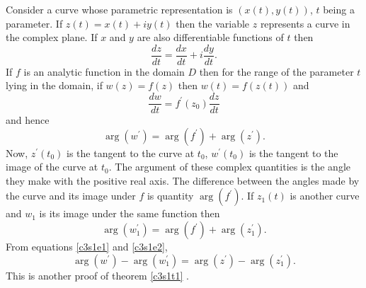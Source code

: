Consider a curve whose parametric representation is $(x(t), y(t))$, $t$ 
being a parameter. If $z(t) = x(t) + iy(t)$ then the variable $z$ represents
a curve in the complex plane. If $x$ and $y$ are also differentiable functions
of $t$ then
\[
\frac{dz}{dt} = \frac{dx}{dt} + i\frac{dy}{dt}.
\]
If $f$ is an analytic function in the domain $D$ then for the range of the
parameter $t$ lying in the domain, if $w(z) = f(z)$ then $w(t) = f(z(t))$ and
\[
\frac{dw}{dt} = f^\prime(z_0)\frac{dz}{dt}
\]
and hence
\begin{equation}\label{c3s1e1}
\arg(w^\prime) = \arg(f^\prime) + \arg(z^\prime).
\end{equation}
Now, $z^\prime(t_0)$ is the tangent to the curve at $t_0$, $w^\prime(t_0)$ is
the tangent to the image of the curve at $t_0$. The argument of these complex
quantities is the angle they make with the positive real axis. The difference 
between the angles made by the curve and its image under $f$ is quantity
$\arg(f^\prime)$. If $z_1(t)$ is another curve and $w_1$ is its image under
the same function then
\begin{equation}\label{c3s1e2}
\arg(w_1^\prime) = \arg(f^\prime) + \arg(z_1^\prime).
\end{equation}
From equations \eqref{c3s1e1} and \eqref{c3s1e2},
\begin{equation}\label{c3s1e3}
\arg(w^\prime) - \arg(w_1^\prime) = \arg(z^\prime) - \arg(z_1^\prime).
\end{equation}
This is another proof of theorem \ref{c3s1t1} \cite{ablowitz2003complex}.



